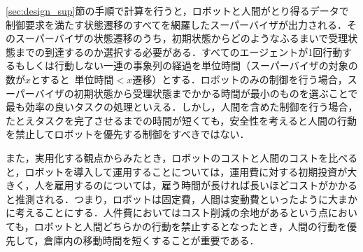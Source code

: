 \ref{sec:design_sup}節の手順で計算を行うと，ロボットと人間がとり得るデータで制御要求を満たす状態遷移のすべてを網羅したスーパーバイザが出力される．そのスーパーバイザの状態遷移のうち，初期状態からどのようなふるまいで受理状態までの到達するのか選択する必要がある．すべてのエージェントが1回行動するもしくは行動しない一連の事象列の経過を単位時間（スーパーバイザの対象の数が$x$とすると\ $単位時間<x遷移$）とする．ロボットのみの制御を行う場合，スーパーバイザの初期状態から受理状態までかかる時間が最小のものを選ぶことで最も効率の良いタスクの処理といえる．しかし，人間を含めた制御を行う場合，たとえタスクを完了させるまでの時間が短くても，安全性を考えると人間の行動を禁止してロボットを優先する制御をすべきではない． 

また，実用化する観点からみたとき，ロボットのコストと人間のコストを比べると，ロボットを導入して運用することについては，運用費に対する初期投資が大きく，人を雇用するのについては，雇う時間が長ければ長いほどコストがかかると推測される．つまり，ロボットは固定費，人間は変動費といったように大まかに考えることにする．人件費においてはコスト削減の余地があるという点においても，ロボットと人間どちらかの行動を禁止するとなったとき，人間の行動を優先して，倉庫内の移動時間を短くすることが重要である．


